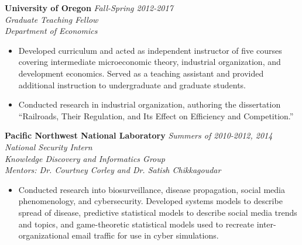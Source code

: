 \documentclass[11pt]{article}
\newenvironment{changemargin}[2]{%
  \begin{list}{}{%
    \setlength{\topsep}{0pt}%
    \setlength{\leftmargin}{#1}%
    \setlength{\rightmargin}{#2}%
    \setlength{\listparindent}{\parindent}%
    \setlength{\itemindent}{\parindent}%
    \setlength{\parsep}{\parskip}%
  }%
  \item[]}{\end{list}
}
\newenvironment{body} {
	\vspace*{-16pt}
	\begin{changemargin}{-0.25in}{-0.5in}
  }	
	{\end{changemargin}
}
\begin{document}
\begin{body}
	\textbf{University of Oregon} \hfill \emph{Fall-Spring 2012-2017}\\
	\emph{Graduate Teaching Fellow}\\
	\emph{Department of Economics}
	\vspace*{-4pt}
	\begin{itemize}
		\item Developed curriculum and acted as independent instructor of five courses covering intermediate microeconomic theory, industrial organization, and development economics. Served as a teaching assistant and provided additional instruction to undergraduate and graduate students.
		\item Conducted research in industrial organization, authoring the dissertation ``Railroads, Their Regulation, and Its Effect on Efficiency and Competition.''
	\end{itemize}

	\textbf{Pacific Northwest National Laboratory}  \hfill \emph{Summers of 2010-2012, 2014}\\
	\emph{National Security Intern}\\ 
	\emph{Knowledge Discovery and Informatics Group}\\
	\emph{Mentors: Dr. Courtney Corley and Dr. Satish Chikkagoudar}
	\vspace*{-4pt}
	\begin{itemize}	
		\item Conducted research into biosurveillance, disease propagation, social media phenomenology, and cybersecurity. Developed systems models to describe spread of disease, predictive statistical models to describe social media trends and topics, and game-theoretic statistical models used to recreate inter-organizational email traffic for use in cyber simulations.
	\end{itemize}
				
\end{body}

\end{document}
